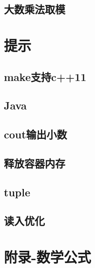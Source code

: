 \documentclass[titlepage,a4paper,10pt]{article}
\begin{document}
\begin{spacing}{0.8}
			\subsection{大数乘法取模}
				
			
		\section{提示}
			\subsection{make支持c++11}
				
			\subsection{Java}
				
			\subsection{cout输出小数}
				
			\subsection{释放容器内存}
				
			\subsection{tuple}
				
			\subsection{读入优化}
				
		\section{附录-数学公式}
		\end{spacing}
		\endgroup
\end{document}

